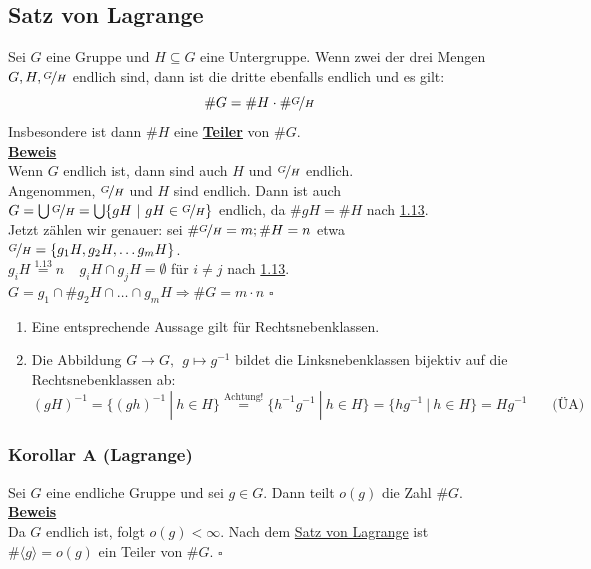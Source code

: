 \documentclass[a4paper, pagesize=pdftex, pdftex, twoside, headsepline, index=totoc,toc=listof, fontsize=10pt, cleardoublepage=empty, headinclude, DIV=13, BCOR=13mm]{scrartcl}
\newcommand{\bet}[1]{\uline{\textbf{#1}}} %
\newcommand{\Index}[1]{\uline{\textbf{#1}}\index{#1}} %
\newcommand{\lh}[1]{\langle #1 \rangle} %
\begin{document}
\subsection{Satz von Lagrange}
\label{sub:satz_von_lagrange}
Sei $G$ eine Gruppe und $H\subseteq G$ eine Untergruppe. Wenn zwei der drei Mengen $G,H,\nicefrac{G}{H}$ endlich sind, dann ist die dritte ebenfalls endlich und es gilt:\\
\[\#G=\#H \cdot \#\nicefrac{G}{H} \]
Insbesondere ist dann $\#H$ eine \Index{Teiler} von $\#G$.\\
\vfill
\bet{Beweis}\\
Wenn $G$ endlich ist, dann sind auch $H$ und $\nicefrac{G}{H}$ endlich.\\
Angenommen, $\nicefrac{G}{H}$ und $H$ sind endlich. Dann ist auch $G= \bigcup \nicefrac{G}{H}=\bigcup\{gH~|~gH\in \nicefrac{G}{H} \}$ endlich, da $\#gH=\#H$ nach \hyperref[sub:nebenklassen]{1.13}.\\
Jetzt zählen wir genauer: sei $\#\nicefrac{G}{H}=m; \#H=n$ etwa $\nicefrac{G}{H}=\{g_1H,g_2H,\dots g_mH \}$.\\
$g_iH\stackrel{\hyperref[sub:nebenklassen]{1.13}}{=}n~~~~~g_iH\cap g_jH=\emptyset$ für $i\not=j$ nach \hyperref[sub:nebenklassen]{1.13}.\\
$G=g_1\cap \#g_2H\cap \dots \cap g_mH \Rightarrow \#G=m\cdot n$
\hfill $\square$

\begin{enumerate}[(1)]
	\item Eine entsprechende Aussage gilt für Rechtsnebenklassen.
	\item Die Abbildung $G \to G,~~g\mapsto g^{-1}$ bildet die Linksnebenklassen bijektiv auf die Rechtsnebenklassen ab:
	\[
	(gH)^{-1}=\{(gh)^{-1}~|~h \in H \} \stackrel{\text{Achtung!}}{=}\{h^{-1}g^{-1}~|~h \in H \}=\{hg^{-1}~|~h\in H \}=Hg^{-1}~~~~~~~~\text{(ÜA)}
	\]
\end{enumerate}

\subsubsection*{Korollar A (Lagrange)}
Sei $G$ eine endliche Gruppe und sei $g\in G$. Dann teilt $o(g)$ die Zahl $\#G$.\\
\bet{Beweis}\\
Da $G$ endlich ist, folgt $o(g)<\infty$. Nach dem \hyperref[sub:satz_von_lagrange]{Satz von Lagrange} ist $\#\lh{g}=o(g)$ ein Teiler von $\#G$.
\hfill $\square$
\end{document}
